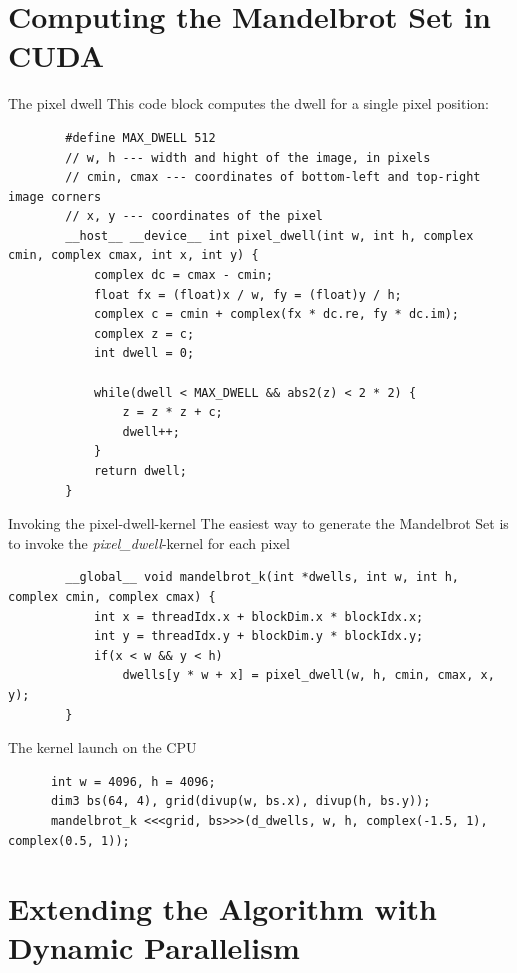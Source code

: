 \documentclass[fleqn,11pt,aspectratio=43]{beamer}
\begin{document}
\section{Computing the Mandelbrot Set in CUDA}

\begin{frame}[fragile]{The pixel dwell}
	This code block computes the dwell for a single pixel position:
	\begin{verbatim}
		#define MAX_DWELL 512
		// w, h --- width and hight of the image, in pixels
		// cmin, cmax --- coordinates of bottom-left and top-right image corners
		// x, y --- coordinates of the pixel
		__host__ __device__ int pixel_dwell(int w, int h, complex cmin, complex cmax, int x, int y) {
			complex dc = cmax - cmin;
			float fx = (float)x / w, fy = (float)y / h;
			complex c = cmin + complex(fx * dc.re, fy * dc.im);
			complex z = c; 
			int dwell = 0;
		
			while(dwell < MAX_DWELL && abs2(z) < 2 * 2) { 
				z = z * z + c;
				dwell++;
			}
			return dwell;
		}
	\end{verbatim}
\end{frame}

\begin{frame}[fragile]{Invoking the pixel-dwell-kernel}
	The easiest way to generate the Mandelbrot Set is to invoke the \textit{pixel\_dwell}-kernel for each pixel
	\begin{verbatim}
		__global__ void mandelbrot_k(int *dwells, int w, int h, complex cmin, complex cmax) {
			int x = threadIdx.x + blockDim.x * blockIdx.x;
			int y = threadIdx.y + blockDim.y * blockIdx.y;
			if(x < w && y < h)
				dwells[y * w + x] = pixel_dwell(w, h, cmin, cmax, x, y);
		}
	\end{verbatim}
	The kernel launch on the CPU
	\begin{verbatim}
	  int w = 4096, h = 4096;
	  dim3 bs(64, 4), grid(divup(w, bs.x), divup(h, bs.y));
	  mandelbrot_k <<<grid, bs>>>(d_dwells, w, h, complex(-1.5, 1), complex(0.5, 1));
	\end{verbatim}
\end{frame}

\section{Extending the Algorithm with Dynamic Parallelism}
\end{document}
